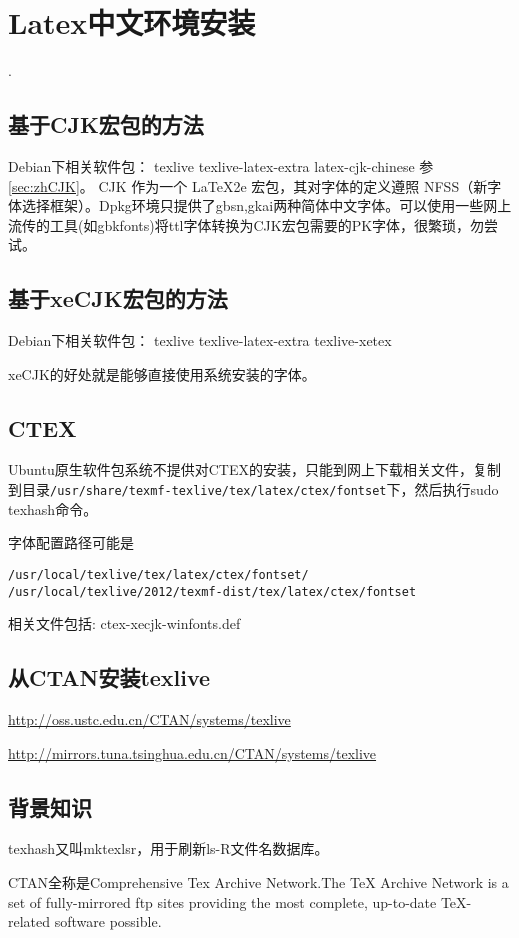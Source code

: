 
\section{Latex中文环境安装}
\label{sec:LatexInstall}.
\subsection{基于CJK宏包的方法}
Debian下相关软件包：
texlive texlive-latex-extra latex-cjk-chinese
参\ref{sec:zhCJK}。
CJK 作为一个 LaTeX2e 宏包，其对字体的定义遵照 NFSS（新字体选择框架）。Dpkg环境只提供了gbsn,gkai两种简体中文字体。可以使用一些网上流传的工具(如gbkfonts)将ttl字体转换为CJK宏包需要的PK字体，很繁琐，勿尝试。

\subsection{基于xeCJK宏包的方法}
Debian下相关软件包：
texlive texlive-latex-extra texlive-xetex

xeCJK的好处就是能够直接使用系统安装的字体。

\subsection{CTEX}
Ubuntu原生软件包系统不提供对CTEX的安装，只能到网上下载相关文件，复制到目录\verb+/usr/share/texmf-texlive/tex/latex/ctex/fontset+下，然后执行sudo texhash命令。

字体配置路径可能是
\begin{verbatim}
/usr/local/texlive/tex/latex/ctex/fontset/
/usr/local/texlive/2012/texmf-dist/tex/latex/ctex/fontset
\end{verbatim}
相关文件包括: ctex-xecjk-winfonts.def

\subsection{从CTAN安装texlive}
\url{http://oss.ustc.edu.cn/CTAN/systems/texlive}

\url{http://mirrors.tuna.tsinghua.edu.cn/CTAN/systems/texlive}

\subsection{背景知识}
texhash又叫mktexlsr，用于刷新ls-R文件名数据库。

CTAN全称是Comprehensive Tex Archive Network.The TeX Archive Network is a set of fully-mirrored ftp sites providing the most complete, up-to-date TeX-related software possible.





